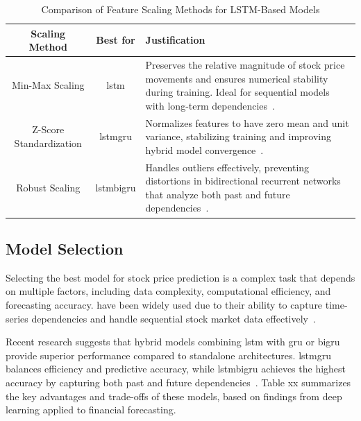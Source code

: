 \begin{table}[H]
    \centering
    \caption{Comparison of Feature Scaling Methods for LSTM-Based Models}
    \label{tab:scaling_methods}
    \begin{tabular}{ccp{7.5cm}}
        \hline
        \textbf{Scaling Method} & \textbf{Best for} & \textbf{Justification} \\
        \hline\hline
        Min-Max Scaling & \acrshort{lstm} & Preserves the relative magnitude of stock price 
        movements and ensures numerical stability during training. Ideal for 
        sequential models with long-term 
        dependencies~\parencite{chang2024StockPrediction}. \\
        Z-Score Standardization & \acrshort{lstmgru} & Normalizes features to have zero mean
        and unit variance, stabilizing training and improving hybrid model 
        convergence~\parencite{balasubramanian2023SystematicSurvey}. \\
        Robust Scaling & \acrshort{lstmbigru} & Handles outliers effectively, preventing 
        distortions in bidirectional recurrent networks that analyze both past and 
        future dependencies~\parencite{shaban2024SMPDL}. \\ \hline
    \end{tabular}
\end{table}

\subsection{Model Selection}

Selecting the best model for stock price prediction is a complex task that depends on
multiple factors, including data complexity, computational efficiency, and forecasting 
accuracy.  have been widely used due to their ability to capture 
time-series dependencies and handle sequential stock market data 
effectively~\parencite{shaban2024SMPDL}.

Recent research suggests that hybrid models combining \acrshort{lstm} with 
\acrshort{gru} or \acrshort{bigru} provide superior performance compared to standalone
architectures. \acrshort{lstmgru} balances efficiency and predictive accuracy, while 
\acrshort{lstmbigru} achieves the highest accuracy by capturing both past and future
dependencies~\parencite{chang2024StockPrediction}. Table xx summarizes the key advantages and trade-offs of these models, based on findings from deep learning applied to financial forecasting.

